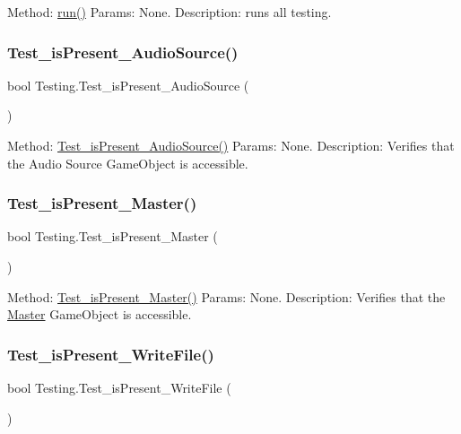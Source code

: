 Method\+: \mbox{\hyperlink{class_testing_a936aed5318322b1d36361ff2952fcf10}{run()}} Params\+: None. Description\+: runs all testing. \mbox{\label{class_testing_af393c6207f2e218b588978223387192a}} 
\subsubsection{\texorpdfstring{Test\_isPresent\_AudioSource()}{Test\_isPresent\_AudioSource()}}
{\footnotesize\ttfamily bool Testing.\+Test\+\_\+is\+Present\+\_\+\+Audio\+Source (\begin{DoxyParamCaption}{ }\end{DoxyParamCaption})}

Method\+: \mbox{\hyperlink{class_testing_af393c6207f2e218b588978223387192a}{Test\+\_\+is\+Present\+\_\+\+Audio\+Source()}} Params\+: None. Description\+: Verifies that the Audio Source Game\+Object is accessible. \mbox{\label{class_testing_acf56298e1ba9488b9f5d7080b6d689ff}} 
\subsubsection{\texorpdfstring{Test\_isPresent\_Master()}{Test\_isPresent\_Master()}}
{\footnotesize\ttfamily bool Testing.\+Test\+\_\+is\+Present\+\_\+\+Master (\begin{DoxyParamCaption}{ }\end{DoxyParamCaption})}

Method\+: \mbox{\hyperlink{class_testing_acf56298e1ba9488b9f5d7080b6d689ff}{Test\+\_\+is\+Present\+\_\+\+Master()}} Params\+: None. Description\+: Verifies that the \mbox{\hyperlink{class_master}{Master}} Game\+Object is accessible. \mbox{\label{class_testing_add39eb411904617805391bdfe144fa1e}} 
\subsubsection{\texorpdfstring{Test\_isPresent\_WriteFile()}{Test\_isPresent\_WriteFile()}}
{\footnotesize\ttfamily bool Testing.\+Test\+\_\+is\+Present\+\_\+\+Write\+File (\begin{DoxyParamCaption}{ }\end{DoxyParamCaption})}

